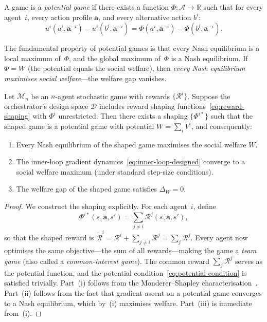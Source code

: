 \begin{definition}\label{def:potential-game}
A game is a \emph{potential game} if there exists a function $\Phi\colon\bm{\mathcal{A}}\to\mathbb{R}$ such that for every agent~$i$, every action profile $\bm{a}$, and every alternative action $b^i$:
\begin{equation}\label{eq:potential-condition}
  u^i(a^i,\bm{a}^{-i}) - u^i(b^i,\bm{a}^{-i}) = \Phi(a^i,\bm{a}^{-i}) - \Phi(b^i,\bm{a}^{-i}).
\end{equation}
\end{definition}

The fundamental property of potential games is that every Nash equilibrium is a local maximum of~$\Phi$, and the global maximum of~$\Phi$ is a Nash equilibrium. If $\Phi = W$ (the potential equals the social welfare), then \emph{every Nash equilibrium maximises social welfare}---the welfare gap vanishes.

\begin{theorem}\label{thm:pareto-shaping}
Let $\mathcal{M}_n$ be an $n$-agent stochastic game with rewards $\{\mathcal{R}^i\}$. Suppose the orchestrator's design space $\mathcal{D}$ includes reward shaping functions~\eqref{eq:reward-shaping} with $\Phi^i$ unrestricted. Then there exists a shaping $\{\Phi^{i*}\}$ such that the shaped game is a potential game with potential $W = \sum_i V^i$, and consequently:
\begin{enumerate}[label=(\roman*)]
  \item Every Nash equilibrium of the shaped game maximises the social welfare $W$.
  \item The inner-loop gradient dynamics~\eqref{eq:inner-loop-designed} converge to a social welfare maximum (under standard step-size conditions).
  \item The welfare gap of the shaped game satisfies $\Delta_W = 0$.
\end{enumerate}
\end{theorem}

\begin{proof}
We construct the shaping explicitly. For each agent~$i$, define
\begin{equation}\label{eq:welfare-shaping}
  \Phi^{i*}(s, \bm{a}, s') = \sum_{j \neq i} \mathcal{R}^j(s, \bm{a}, s'),
\end{equation}
so that the shaped reward is $\tilde{\mathcal{R}}^i = \mathcal{R}^i + \sum_{j\neq i}\mathcal{R}^j = \sum_j \mathcal{R}^j$. Every agent now optimises the same objective---the sum of all rewards---making the game a \emph{team game} (also called a \emph{common-interest game}). The common reward $\sum_j \mathcal{R}^j$ serves as the potential function, and the potential condition~\eqref{eq:potential-condition} is satisfied trivially. Part~(i) follows from the Monderer--Shapley characterisation~\cite{monderer1996}. Part~(ii) follows from the fact that gradient ascent on a potential game converges to a Nash equilibrium, which by~(i) maximises welfare. Part~(iii) is immediate from~(i).
\end{proof}

